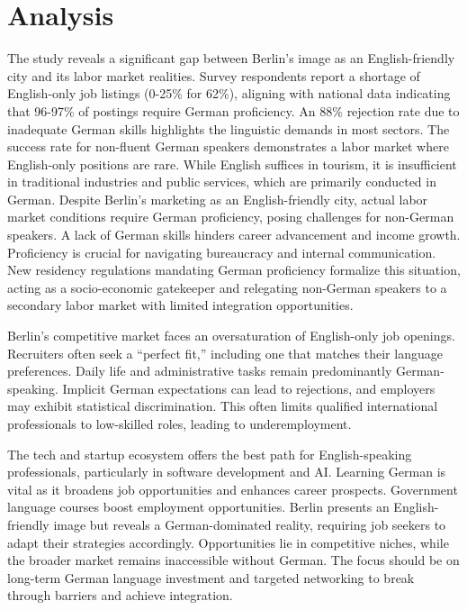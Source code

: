 \section{Analysis}
The study reveals a significant gap between Berlin’s image as an English-friendly city and its labor market realities. Survey respondents report a shortage of English-only job listings (0-25\% for 62\%), aligning with national data indicating that 96-97\% of postings require German proficiency. An 88\% rejection rate due to inadequate German skills highlights the linguistic demands in most sectors. The success rate for non-fluent German speakers demonstrates a labor market where English-only positions are rare. While English suffices in tourism, it is insufficient in traditional industries and public services, which are primarily conducted in German. Despite Berlin’s marketing as an English-friendly city, actual labor market conditions require German proficiency, posing challenges for non-German speakers. A lack of German skills hinders career advancement and income growth. Proficiency is crucial for navigating bureaucracy and internal communication. New residency regulations mandating German proficiency formalize this situation, acting as a socio-economic gatekeeper and relegating non-German speakers to a secondary labor market with limited integration opportunities.

Berlin’s competitive market faces an oversaturation of English-only job openings. Recruiters often seek a “perfect fit,” including one that matches their language preferences. Daily life and administrative tasks remain predominantly German-speaking. Implicit German expectations can lead to rejections, and employers may exhibit statistical discrimination. This often limits qualified international professionals to low-skilled roles, leading to underemployment.

The tech and startup ecosystem offers the best path for English-speaking professionals, particularly in software development and AI. Learning German is vital as it broadens job opportunities and enhances career prospects. Government language courses boost employment opportunities. Berlin presents an English-friendly image but reveals a German-dominated reality, requiring job seekers to adapt their strategies accordingly. Opportunities lie in competitive niches, while the broader market remains inaccessible without German. The focus should be on long-term German language investment and targeted networking to break through barriers and achieve integration. \par
